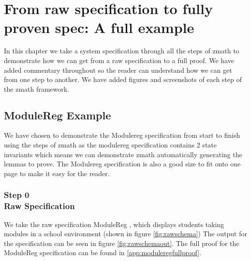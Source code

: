 \chapter{From raw specification to fully proven spec: A full example}
\label{ch:fullexample}

In this chapter we take a system specification through all the steps of
\gls{zmath} to demonstrate how we can get from a raw specification to a full
proof. We have added commentary throughout so the reader can understand how we
can get from one step to another. We have added figures and screenshots of each
step of the \gls{zmath} framework.

\section{ModuleReg Example}
We have chosen to demonstrate the Modulereg specification from start to finish
using the steps of \gls{zmath} as the modulereg specification contains 2 state
invariants which means we can demonstrate \gls{zmath} automatically generating
the lemmas to prove. The  Modulereg specification is also a good size to fit
onto one page to make it easy for the reader.

\subsection{Step 0\\Raw Specification}
We take the raw specification ModuleReg \cite{essenceofz}, which displays students
taking modules in a school environment (shown in figure \ref{fig:rawschema}) The
output for the specification can be seen in figure \ref{fig:rawschemaout}. The
full proof for the ModuleReg specification can be found in \ref{app:moduleregfullproof}.

